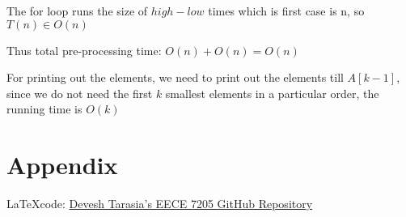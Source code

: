 \documentclass[12pt,letterpaper]{article}
\begin{document}
 The for loop runs the size of $high-low$ times which is first case is n, so $T(n) \in O(n)$
  
  Thus total pre-processing time: $O(n)+O(n)=O(n)$
  
  For printing out the elements, we need to print out the elements till $A[k-1]$, since we do not need the first $k$ smallest elements in a particular order, the running time is $O(k)$
  
  \newpage
  \section*{Appendix}
  \LaTeX code: \href{https://github.com/DEVESHTARASIA/EECE-7205/blob/main/HW2.tex}{Devesh Tarasia's EECE 7205 GitHub Repository}
  
  
  
  
  
%
%
%
%     
%    
%     
%


\end{document}
